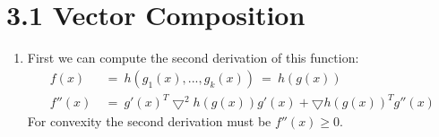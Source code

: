 \documentclass{report}
\begin{document}
	\pagestyle{fancy}
	\hfill \\ \\
	
	\section*{3.1 Vector Composition}
		\begin{enumerate}[]
			\item First we can compute the second derivation of this function:
			\begin{align*}
				f(x) \ & = \ h(g_1(x), ..., g_k(x)) \ = \ h(g(x)) \\
				f''(x) \ & = \ g'(x)^T \bigtriangledown ^2 h(g(x)) g'(x) + \bigtriangledown h(g(x))^T g''(x)
			\end{align*}
			For convexity the second derivation must be $f''(x) \geq 0$.
		\end{enumerate}
\end{document}
